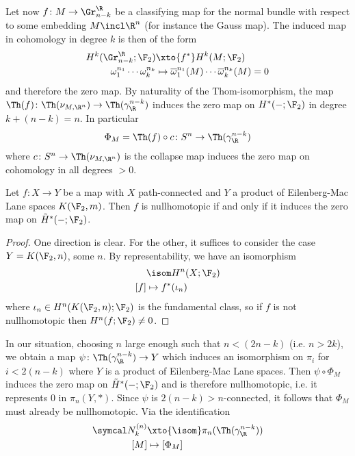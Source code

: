 Let now $f\colon M \to \Gr_{n - k}^\R$ be a classifying map for the normal bundle with respect to some embedding $M \incl \R^n$ (for instance the Gauss map).
The induced map in cohomology in degree $k$ is then of the form
\begin{align*}
	H^k(\Gr_{n - k}^\R; \F_2) &\xto{f^*} H^k(M; \F_2) \\
	\omega_1^{n_1} \cdots \omega_k^{n_k} &\mapsto \overline{\omega}_1^{n_1}(M) \cdots \overline{\omega}_k^{n_k}(M) = 0
\end{align*}
and therefore the zero map.
By naturality of the Thom-isomorphism, the map $\Th(f)\colon \Th(\nu_{M, \R^n}) \to \Th(\gamma_\R^{n - k})$ induces the zero map on $H^*({{-}}; \F_2)$ in degree $k + (n - k) = n$.
In particular
\begin{equation*}
	\Phi_M = \Th(f) \circ c\colon S^n \to \Th(\gamma_\R^{n - k})
\end{equation*}
where $c\colon S^n \to \Th(\nu_{M, \R^n})$ is the collapse map induces the zero map on cohomology in all degrees $> 0$.
\begin{lemma}
	Let $f\colon X \to Y$ be a map with $X$ path-connected and $Y$ a product of Eilenberg-Mac Lane spaces $K(\F_2, m)$.
	Then $f$ is nullhomotopic if and only if it induces the zero map on $\tilde{H}^*({{-}}; \F_2)$.
\end{lemma}
\begin{proof}
	One direction is clear.
	For the other, it suffices to consider the case $Y = K(\F_2, n)$, some $n$.
	By representability, we have an isomorphism 
	\begin{align*}
		[X, K(\F_2, n)] &\isom H^n(X; \F_2) \\
		[f] &\mapsto f^*(\iota_n)
	\end{align*}
	where $\iota_n \in H^n(K(\F_2, n); \F_2)$ is the fundamental class, so if $f$ is not nullhomotopic then $H^n(f; \F_2) \neq 0$.
\end{proof}
In our situation, choosing $n$ large enough such that $n < (2n - k)$ (i.e. $n > 2k$), we obtain a map $\psi\colon \Th(\gamma_\R^{n - k}) \to Y$ which induces an isomorphism on $\pi_i$ for $i < 2(n - k)$ where $Y$ is a product of Eilenberg-Mac Lane spaces.
Then $\psi \circ \Phi_M$ induces the zero map on $\tilde{H}^*({{-}}; \F_2)$ and is therefore nullhomotopic, i.e. it represents 0 in $\pi_n(Y, *)$.
Since $\psi$ is $2(n - k) > n$-connected, it follows that $\Phi_M$ must already be nullhomotopic.
Via the identification
\begin{align*}
	\Bord_k^{(n)} &\xto{\isom} \pi_n(\Th(\gamma_\R^{n - k})) \\
	[M] &\mapsto [\Phi_M]
\end{align*}
